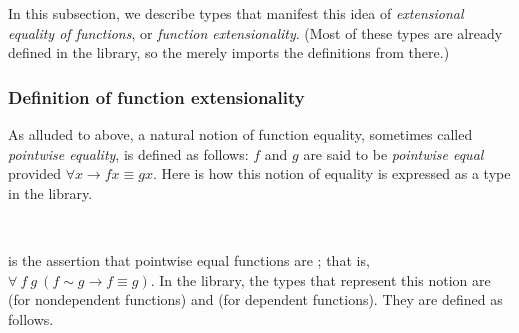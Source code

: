 In this subsection, we describe types that manifest this idea of \emph{extensional equality of functions}, or \emph{function extensionality}. (Most of these types are already defined in the \typetopology library, so the \ualib merely imports the definitions from there.)

\subsubsection{Definition of function extensionality}\label{sec:defin-funct-extens}

As alluded to above, a natural notion of function equality, sometimes called \emph{pointwise equality}, is defined as follows: \(f\) and \(g\) are said to be \emph{pointwise equal} provided \(∀ x → f x ≡ g x\). Here is how this notion of equality is expressed as a type in the \typetopology library.
\ccpad
\begin{code}%
\>[1]\AgdaSpace{}%
\AgdaSymbol{:}\AgdaSpace{}%
\AgdaSymbol{\{}\AgdaSpace{}%
\AgdaSpace{}%
\AgdaSymbol{:}\AgdaSpace{}%
\AgdaSymbol{\}\{}\AgdaSpace{}%
\AgdaSymbol{:}\AgdaSpace{}%
\AgdaSpace{}%
\AgdaSpace{}%
\AgdaSymbol{\}}\AgdaSpace{}%
\AgdaSymbol{\{}\AgdaSpace{}%
\AgdaSymbol{:}\AgdaSpace{}%
\AgdaSpace{}%
\AgdaSpace{}%
\AgdaSpace{}%
\AgdaSpace{}%
\AgdaSymbol{\}}\AgdaSpace{}%
\AgdaSpace{}%
\AgdaSpace{}%
\AgdaSpace{}%
\AgdaSpace{}%
\AgdaSpace{}%
\AgdaSpace{}%
\AgdaSpace{}%
\AgdaSpace{}%
\AgdaSpace{}%
\AgdaSpace{}%
\<%
\\
%
\>[1]\AgdaSpace{}%
\AgdaSpace{}%
\AgdaSpace{}%
\AgdaSymbol{=}\AgdaSpace{}%
\AgdaSpace{}%
\AgdaSpace{}%
\AgdaSpace{}%
\AgdaSpace{}%
\AgdaSpace{}%
\AgdaSpace{}%
\AgdaSpace{}%
\<%
\end{code}
\ccpad
{} is the assertion that pointwise equal functions are ; that is, \(\forall\ f\ g\ (f ∼ g → f ≡ g)\). In the \typetopology library, the types that represent this notion are  (for nondependent functions) and  (for dependent functions). They are defined as follows.
